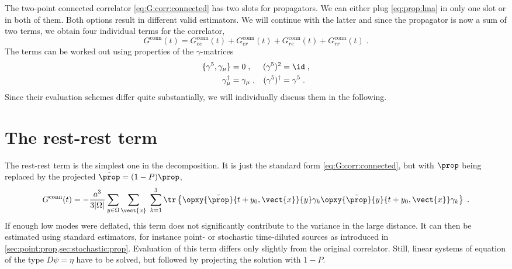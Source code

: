 The two-point connected correlator \cref{eq:G:corr:connected} has two slots for propagators.
We can either plug \cref{eq:prop:lma} in only one slot or in both of them.
Both options result in different valid estimators.
We will continue with the latter and since the propagator is now a sum of two terms, we obtain four individual terms for the correlator,
\begin{equation}
G^{\text{conn}}(t)
= G_{ee}^{\text{conn}}(t)
+ G_{er}^{\text{conn}}(t)
+ G_{re}^{\text{conn}}(t)
+ G_{rr}^{\text{conn}}(t) \;.
\end{equation}
The terms can be worked out using properties of the $\gamma$-matrices
\begin{align}
\{\gamma^{5}, \gamma_{\mu}\} &= 0 \;,        &  (\gamma^{5})^{2} &= \id \;, \\
\gamma_{\mu}^{\dagger} &= \gamma_{\mu} \;,   &  (\gamma^{5})^{\dagger} &= \gamma^{5} \;.
\end{align}
Since their evaluation schemes differ quite substantially, we will individually discuss them in the following.

\section{The rest-rest term}
\label{sec:lma:rr}

The rest-rest term is the simplest one in the decomposition.
It is just the standard form \cref{eq:G:corr:connected}, but with $\prop$ being replaced by the projected $\tilde{\prop} = (1-P)\prop$,
\begin{equation}
G^{\text{conn}}(t) =
- \frac{a^{3}}{3 \lvert \Omega \rvert}
\sum_{y \in \Omega}
\sum_{\vect{x}} \;
\sum_{k=1}^{3}
\tr \left\{
  \opxy{\tilde{\prop}}{t+y_0, \vect{x}}{y} \gamma_k \opxy{\tilde{\prop}}{y}{t+y_0, \vect{x}} \gamma_k
\right\} \;.
\end{equation}
If enough low modes were deflated, this term does not significantly contribute to the variance in the large distance.
It can then be estimated using standard estimators, for instance point- or stochastic time-diluted sources as introduced in \cref{sec:point:prop,sec:stochastic:prop}.
Evaluation of this term differs only slightly from the original correlator.
Still, linear systems of equation of the type $D \psi = \eta$ have to be solved, but followed by projecting the solution with $1-P$.

